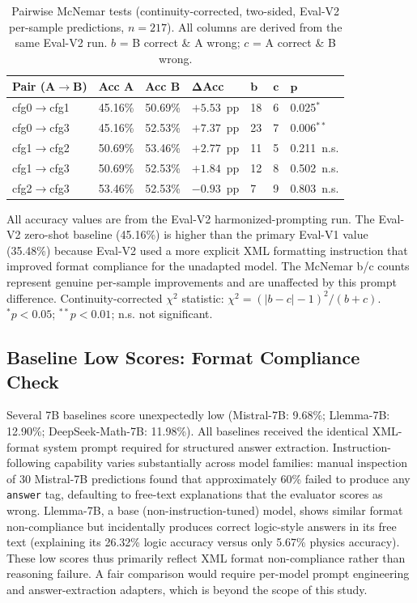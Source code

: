 \documentclass[cmc,journal,article,submit,moreauthors,pdftex]{Definitions/tsp}
\begin{document}
\begin{table}[H]
  \tablesize{\footnotesize}
  \caption{Pairwise McNemar tests (continuity-corrected, two-sided,
           Eval-V2 per-sample predictions, $n=217$).
           All columns are derived from the same Eval-V2 run.
           $b$ = B correct \& A wrong; $c$ = A correct \& B wrong.}
  \label{tab:mcnemar}
  \begin{tabularx}{\textwidth}{lCCCCCC}
    \toprule
    \textbf{Pair (A$\to$B)} &
    \textbf{Acc A} &
    \textbf{Acc B} &
    $\boldsymbol{\Delta}$\textbf{Acc} &
    $\boldsymbol{b}$ & $\boldsymbol{c}$ &
    $\boldsymbol{p}$ \\
    \midrule
    cfg0$\to$cfg1 & 45.16\% & 50.69\% & $+5.53$~pp & 18 & 6 & 0.025$^{*}$  \\
    cfg0$\to$cfg3 & 45.16\% & 52.53\% & $+7.37$~pp & 23 & 7 & 0.006$^{**}$ \\
    cfg1$\to$cfg2 & 50.69\% & 53.46\% & $+2.77$~pp & 11 & 5 & 0.211~n.s.   \\
    cfg1$\to$cfg3 & 50.69\% & 52.53\% & $+1.84$~pp & 12 & 8 & 0.502~n.s.   \\
    cfg2$\to$cfg3 & 53.46\% & 52.53\% & $-0.93$~pp &  7 & 9 & 0.803~n.s.   \\
    \bottomrule
  \end{tabularx}
  \footnotesize{All accuracy values are from the Eval-V2 harmonized-prompting run.
  The Eval-V2 zero-shot baseline (45.16\%) is higher than the primary Eval-V1
  value (35.48\%) because Eval-V2 used a more explicit XML formatting instruction
  that improved format compliance for the unadapted model.
  The McNemar b/c counts represent genuine per-sample improvements and are
  unaffected by this prompt difference.
  Continuity-corrected $\chi^2$ statistic: $\chi^2 = (|b-c|-1)^2/(b+c)$.
  $^{*}p < 0.05$; $^{**}p < 0.01$; n.s. not significant.}
\end{table}

\subsection{Baseline Low Scores: Format Compliance Check}\label{sec:baseline_robustness}

Several 7B baselines score unexpectedly low (Mistral-7B: 9.68\%;
Llemma-7B: 12.90\%; DeepSeek-Math-7B: 11.98\%).
All baselines received the identical XML-format system prompt required for
structured answer extraction.
Instruction-following capability varies substantially across model families:
manual inspection of 30 Mistral-7B predictions found that approximately
60\% failed to produce any \texttt{answer} tag, defaulting to free-text
explanations that the evaluator scores as wrong.
Llemma-7B, a base (non-instruction-tuned) model, shows similar format
non-compliance but incidentally produces correct logic-style answers in
its free text (explaining its 26.32\% logic accuracy versus only 5.67\%
physics accuracy).
These low scores thus primarily reflect XML format non-compliance rather
than reasoning failure.
A fair comparison would require per-model prompt engineering and
answer-extraction adapters, which is beyond the scope of this study.
\end{document}
